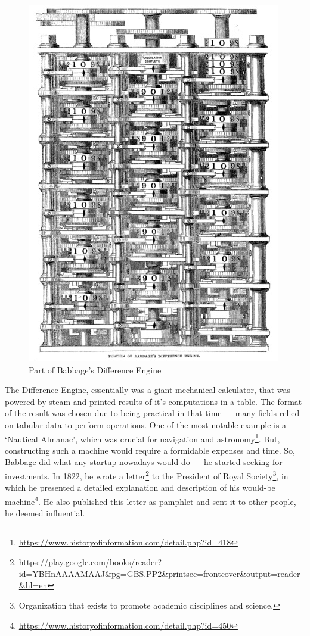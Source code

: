 \documentclass{article}
\begin{document}
            \begin{figure}
                \centering
                \includegraphics[scale=0.25]{images/devices/device_babbage_difference_engine.jpg}
                \caption{Part of Babbage's Difference Engine}
            \end{figure}


            The Difference Engine, essentially was a giant mechanical calculator, that was powered by steam and printed results of it's computations in a table. 
            The format of the result was chosen due to being practical in that time --- many fields relied on tabular data to perform operations. One of the most
            notable example is a `Nautical Almanac', which was crucial for navigation and astronomy\footnote{\href{https://www.historyofinformation.com/detail.php?id=418}
            {https://www.historyofinformation.com/detail.php?id=418}}. But, constructing such a machine would require a formidable expenses and time. So, Babbage did what
            any startup nowadays would do --- he started seeking for investments. 
            In 1822, he wrote a letter\footnote{\href{https://play.google.com/books/reader?id=YBHnAAAAMAAJ&pg=GBS.PP2&printsec=frontcover&output=reader&hl=en}
            {https://play.google.com/books/reader?id=YBHnAAAAMAAJ\&pg=GBS.PP2\&printsec=frontcover\&output=reader\&hl=en}}
            to the President of Royal Society\footnote{Organization that exists to promote academic disciplines and science.}, in which he presented a 
            detailed explanation and description of his would-be machine\footnote{\href{https://www.historyofinformation.com/detail.php?id=450}
            {https://www.historyofinformation.com/detail.php?id=450}}. He also published this letter as pamphlet and sent it to other people, he deemed influential. \par
\end{document}
